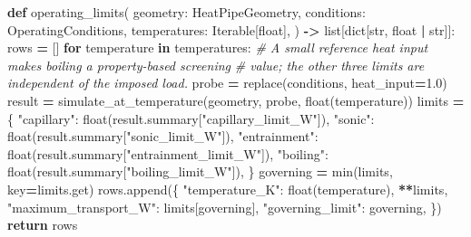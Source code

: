 \documentclass[
  12pt,a4paper,oneside]{report}
\newenvironment{Shaded}{\begin{snugshade}}{\end{snugshade}}
\newcommand{\BuiltInTok}[1]{#1}
\newcommand{\CommentTok}[1]{\textcolor[rgb]{0.56,0.35,0.01}{\textit{#1}}}
\newcommand{\ControlFlowTok}[1]{\textcolor[rgb]{0.13,0.29,0.53}{\textbf{#1}}}
\newcommand{\FloatTok}[1]{\textcolor[rgb]{0.00,0.00,0.81}{#1}}
\newcommand{\KeywordTok}[1]{\textcolor[rgb]{0.13,0.29,0.53}{\textbf{#1}}}
\newcommand{\NormalTok}[1]{#1}
\newcommand{\OperatorTok}[1]{\textcolor[rgb]{0.81,0.36,0.00}{\textbf{#1}}}
\newcommand{\StringTok}[1]{\textcolor[rgb]{0.31,0.60,0.02}{#1}}
\begin{document}
\begin{Shaded}
\begin{Highlighting}[]
\KeywordTok{def}\NormalTok{ operating\_limits(}
\NormalTok{    geometry: HeatPipeGeometry,}
\NormalTok{    conditions: OperatingConditions,}
\NormalTok{    temperatures: Iterable[}\BuiltInTok{float}\NormalTok{],}
\NormalTok{) }\OperatorTok{{-}\textgreater{}} \BuiltInTok{list}\NormalTok{[}\BuiltInTok{dict}\NormalTok{[}\BuiltInTok{str}\NormalTok{, }\BuiltInTok{float} \OperatorTok{|} \BuiltInTok{str}\NormalTok{]]:}
\NormalTok{    rows }\OperatorTok{=}\NormalTok{ []}
    \ControlFlowTok{for}\NormalTok{ temperature }\KeywordTok{in}\NormalTok{ temperatures:}
        \CommentTok{\# A small reference heat input makes boiling a property{-}based screening}
        \CommentTok{\# value; the other three limits are independent of the imposed load.}
\NormalTok{        probe }\OperatorTok{=}\NormalTok{ replace(conditions, heat\_input}\OperatorTok{=}\FloatTok{1.0}\NormalTok{)}
\NormalTok{        result }\OperatorTok{=}\NormalTok{ simulate\_at\_temperature(geometry, probe, }\BuiltInTok{float}\NormalTok{(temperature))}
\NormalTok{        limits }\OperatorTok{=}\NormalTok{ \{}
            \StringTok{"capillary"}\NormalTok{: }\BuiltInTok{float}\NormalTok{(result.summary[}\StringTok{"capillary\_limit\_W"}\NormalTok{]),}
            \StringTok{"sonic"}\NormalTok{: }\BuiltInTok{float}\NormalTok{(result.summary[}\StringTok{"sonic\_limit\_W"}\NormalTok{]),}
            \StringTok{"entrainment"}\NormalTok{: }\BuiltInTok{float}\NormalTok{(result.summary[}\StringTok{"entrainment\_limit\_W"}\NormalTok{]),}
            \StringTok{"boiling"}\NormalTok{: }\BuiltInTok{float}\NormalTok{(result.summary[}\StringTok{"boiling\_limit\_W"}\NormalTok{]),}
\NormalTok{        \}}
\NormalTok{        governing }\OperatorTok{=} \BuiltInTok{min}\NormalTok{(limits, key}\OperatorTok{=}\NormalTok{limits.get)}
\NormalTok{        rows.append(\{}
            \StringTok{"temperature\_K"}\NormalTok{: }\BuiltInTok{float}\NormalTok{(temperature),}
            \OperatorTok{**}\NormalTok{limits,}
            \StringTok{"maximum\_transport\_W"}\NormalTok{: limits[governing],}
            \StringTok{"governing\_limit"}\NormalTok{: governing,}
\NormalTok{        \})}
    \ControlFlowTok{return}\NormalTok{ rows}



\end{Highlighting}
\end{Shaded}
\end{document}

